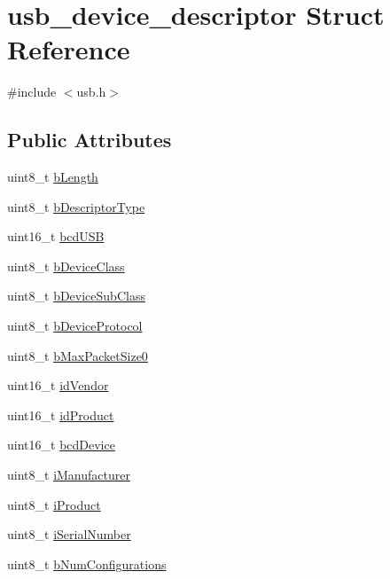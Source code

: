 \hypertarget{structusb__device__descriptor}{\section{usb\-\_\-device\-\_\-descriptor Struct Reference}
\label{structusb__device__descriptor}
}


{\ttfamily \#include $<$usb.\-h$>$}

\subsection*{Public Attributes}
\begin{DoxyCompactItemize}
\item 
uint8\-\_\-t \hyperlink{structusb__device__descriptor_af3f980ad55af3fd6c222a8802996ab63}{b\-Length}
\item 
uint8\-\_\-t \hyperlink{structusb__device__descriptor_ad1ba08da6ad5b6023f1d0d1461daab7d}{b\-Descriptor\-Type}
\item 
uint16\-\_\-t \hyperlink{structusb__device__descriptor_aa400edb6c3183d4922411cdaf980b84e}{bcd\-U\-S\-B}
\item 
uint8\-\_\-t \hyperlink{structusb__device__descriptor_aa657267e1d9762b7d2ed3eb60a78d9ad}{b\-Device\-Class}
\item 
uint8\-\_\-t \hyperlink{structusb__device__descriptor_aecfbe730bc3eeccc9c4b5fd17f5f3c3c}{b\-Device\-Sub\-Class}
\item 
uint8\-\_\-t \hyperlink{structusb__device__descriptor_a56829af76e57a6ea4fc621b52a0664f8}{b\-Device\-Protocol}
\item 
uint8\-\_\-t \hyperlink{structusb__device__descriptor_ac7f47eb197506ac5c555bb4f2fe82d32}{b\-Max\-Packet\-Size0}
\item 
uint16\-\_\-t \hyperlink{structusb__device__descriptor_a043126e48bebbab536540e44428b6b4f}{id\-Vendor}
\item 
uint16\-\_\-t \hyperlink{structusb__device__descriptor_a70d5ecc7bad486b8a8840d86aa151579}{id\-Product}
\item 
uint16\-\_\-t \hyperlink{structusb__device__descriptor_a41416aa4a49999d2f3f0f67bdc5fa7da}{bcd\-Device}
\item 
uint8\-\_\-t \hyperlink{structusb__device__descriptor_ad082330020575944b8471459b816cb40}{i\-Manufacturer}
\item 
uint8\-\_\-t \hyperlink{structusb__device__descriptor_acb90b91c59e65adbcc21949cf0f486f7}{i\-Product}
\item 
uint8\-\_\-t \hyperlink{structusb__device__descriptor_a105d91b68091e61c9b13ea673fb98eaf}{i\-Serial\-Number}
\item 
uint8\-\_\-t \hyperlink{structusb__device__descriptor_a603204b0517e9ece9bc0d8476b2a7cdc}{b\-Num\-Configurations}
\end{DoxyCompactItemize}


